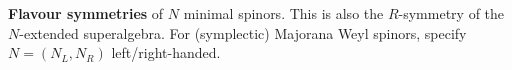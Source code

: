 \documentclass[10pt,letterpaper]{article}
\def\myparagraph #1{\textbf{#1}}
\begin{document}
\myparagraph{Flavour symmetries} of $N$ minimal spinors.
This is also the $R$-symmetry of the $N$-extended superalgebra.
For (symplectic) Majorana Weyl spinors, specify $N=(N_L,N_R)$ left/right-handed.
\begin{center}
\vspace{-.5\baselineskip}
\end{center}
\end{document}
